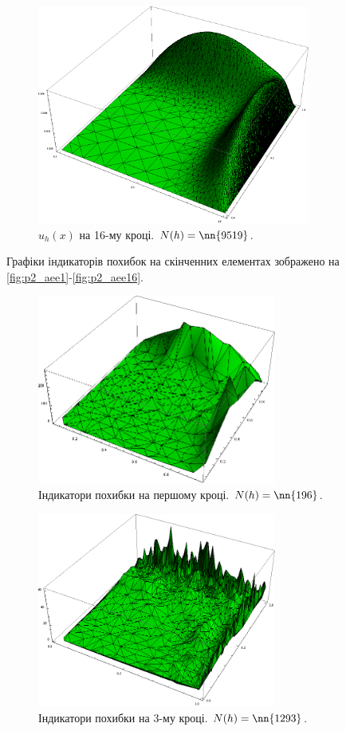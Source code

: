 \begin{figure}[H]
	\centering
    \includegraphics[width=0.8\textwidth]{problem2/my/solutions/solution16}
    \caption{$u_h(x)$ на 16-му кроці. $N(h) = \nn{9519}$.}
    \label{fig:p2_solution16}
\end{figure}

\clearpage
Графіки індикаторів похибок на скінченних елементах зображено на \autoref{fig:p2_aee1}-\ref{fig:p2_aee16}.

\begin{figure}[H]
	\centering
    \includegraphics[width=0.7\textwidth]{problem2/my/AEE/aee1}
    \caption{Індикатори похибки на першому кроці. $N(h) = \nn{196}$.}
    \label{fig:p2_aee1}
\end{figure}

\begin{figure}[H]
	\centering
    \includegraphics[width=0.7\textwidth]{problem2/my/AEE/aee3}
    \caption{Індикатори похибки на 3-му кроці. $N(h) = \nn{1293}$.}
    \label{fig:p2_aee3}
\end{figure}


